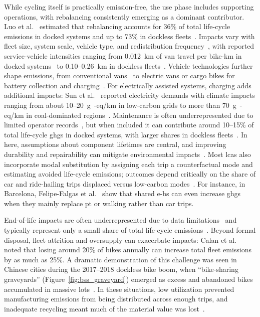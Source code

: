     While cycling itself is practically emission-free, the use phase includes supporting operations, with rebalancing consistently emerging as a dominant contributor. Luo et al.~\cite{Luo2019} estimated that rebalancing accounts for 36\% of total life-cycle emissions in docked systems and up to 73\% in dockless fleets~\cite{Luo2019}. Impacts vary with fleet size, system scale, vehicle type, and redistribution frequency~\cite{Bonilla-Alicea2020}, with reported service-vehicle intensities ranging from 0.012~km of van travel per bike-km in docked systems~\cite{Felipe-Falgas2022} to 0.10--0.26~km in dockless fleets~\cite{Sun2022, Cazzola2020}. Vehicle technologies further shape emissions, from conventional vans~\cite{Chen2020LifeCycle, Hollingsworth2019} to electric vans or cargo bikes for battery collection and charging~\cite{Felipe-Falgas2022, Calan2024}. For electrically assisted systems, charging adds additional impacts: Sun et al.~\cite{Sun2022} reported electricity demands with climate impacts ranging from about 10--20~g~-eq/km in low-carbon grids to more than 70~g~-eq/km in coal-dominated regions~\cite{Zhu2023, Calan2024}.  Maintenance is often underrepresented due to limited operator records~\cite{Calan2024}, but when included it can contribute around 10--15\% of total life-cycle \acp{ghg} in docked systems, with larger shares in dockless fleets~\cite{Sun2022, Chen2024, deBortoli2021Environmental, Luo2019}. In here, assumptions about component lifetimes are central, and improving durability and repairability can mitigate environmental impacts~\cite{Zhu2023, Calan2024}. Most \acp{lca} also incorporate modal substitution by assigning each trip a counterfactual mode and estimating avoided life-cycle emissions; outcomes depend critically on the share of car and ride-hailing trips displaced versus low-carbon modes~\cite{Krauss2022}. For instance, in Barcelona, Felipe-Falgas et al.~\cite{Felipe-Falgas2022} show that shared \acp{e-b} can even increase \acp{ghg} when they mainly replace \ac{pt} or walking rather than car trips.

    End-of-life impacts are often underrepresented due to data limitations~\cite{Calan2024} and typically represent only a small share of total life-cycle emissions~\cite{Krauss2022}. Beyond formal disposal, fleet attrition and oversupply can exacerbate impacts: Calan et al.~\cite{Calan2024} noted that losing around 20\% of bikes annually can increase total fleet emissions by as much as 25\%. A dramatic demonstration of this challenge was seen in Chinese cities during the 2017--2018 dockless bike boom, when ``bike-sharing graveyards'' (Figure~\ref{fig:bss_graveyard}) emerged as excess and abandoned bikes accumulated in massive lots~\cite{Sun2022, AmusingPlanet2018}. In these situations, low utilization prevented manufacturing emissions from being distributed across enough trips, and inadequate recycling meant much of the material value was lost~\cite{Luo2019, Sun2022}.

